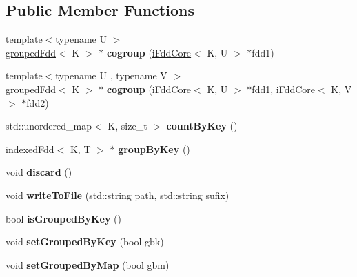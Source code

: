 \subsection*{Public Member Functions}
\begin{DoxyCompactItemize}
\item 
\hypertarget{classfaster_1_1iFddCore_a311cd5a470392a25565057aaf0fa3226}{}\label{classfaster_1_1iFddCore_a311cd5a470392a25565057aaf0fa3226} 
{\footnotesize template$<$typename U $>$ }\\\hyperlink{classfaster_1_1groupedFdd}{grouped\+Fdd}$<$ K $>$ $\ast$ {\bfseries cogroup} (\hyperlink{classfaster_1_1iFddCore}{i\+Fdd\+Core}$<$ K, U $>$ $\ast$fdd1)
\item 
\hypertarget{classfaster_1_1iFddCore_af434c1c5118e380f9d78398fe46176d5}{}\label{classfaster_1_1iFddCore_af434c1c5118e380f9d78398fe46176d5} 
{\footnotesize template$<$typename U , typename V $>$ }\\\hyperlink{classfaster_1_1groupedFdd}{grouped\+Fdd}$<$ K $>$ $\ast$ {\bfseries cogroup} (\hyperlink{classfaster_1_1iFddCore}{i\+Fdd\+Core}$<$ K, U $>$ $\ast$fdd1, \hyperlink{classfaster_1_1iFddCore}{i\+Fdd\+Core}$<$ K, V $>$ $\ast$fdd2)
\item 
\hypertarget{classfaster_1_1iFddCore_a4ed897a7b2af2918f91c3f8f89835ed4}{}\label{classfaster_1_1iFddCore_a4ed897a7b2af2918f91c3f8f89835ed4} 
std\+::unordered\+\_\+map$<$ K, size\+\_\+t $>$ {\bfseries count\+By\+Key} ()
\item 
\hypertarget{classfaster_1_1iFddCore_ac671d250f94c0927152362d4a982e931}{}\label{classfaster_1_1iFddCore_ac671d250f94c0927152362d4a982e931} 
\hyperlink{classfaster_1_1indexedFdd}{indexed\+Fdd}$<$ K, T $>$ $\ast$ {\bfseries group\+By\+Key} ()
\item 
\hypertarget{classfaster_1_1iFddCore_a9a7002de9ec87e594aa461c1b379b453}{}\label{classfaster_1_1iFddCore_a9a7002de9ec87e594aa461c1b379b453} 
void {\bfseries discard} ()
\item 
\hypertarget{classfaster_1_1iFddCore_a6058211f45b0f603ff6e2ffab1976148}{}\label{classfaster_1_1iFddCore_a6058211f45b0f603ff6e2ffab1976148} 
void {\bfseries write\+To\+File} (std\+::string path, std\+::string sufix)
\item 
\hypertarget{classfaster_1_1iFddCore_a85b2607d1cc8f604a3965c313f16b240}{}\label{classfaster_1_1iFddCore_a85b2607d1cc8f604a3965c313f16b240} 
bool {\bfseries is\+Grouped\+By\+Key} ()
\item 
\hypertarget{classfaster_1_1iFddCore_a37c6f71cc6ce171ccd78120c7103f181}{}\label{classfaster_1_1iFddCore_a37c6f71cc6ce171ccd78120c7103f181} 
void {\bfseries set\+Grouped\+By\+Key} (bool gbk)
\item 
\hypertarget{classfaster_1_1iFddCore_a54fc3721d1e6291b9e741c7d5e2b7573}{}\label{classfaster_1_1iFddCore_a54fc3721d1e6291b9e741c7d5e2b7573} 
void {\bfseries set\+Grouped\+By\+Map} (bool gbm)
\end{DoxyCompactItemize}
